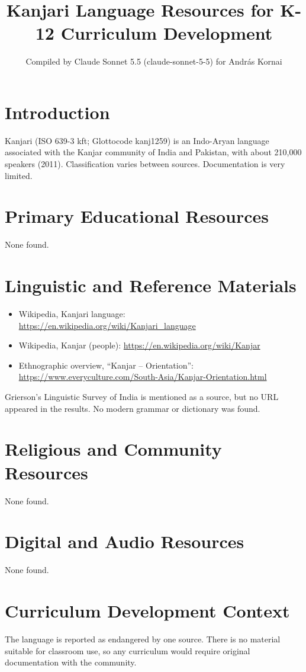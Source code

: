 \documentclass[12pt]{article}
\title{Kanjari Language Resources for K-12 Curriculum Development}
\author{Compiled by Claude Sonnet 5.5 (claude-sonnet-5-5) for Andr\'as Kornai}
\date{}
\begin{document}
\maketitle

\section{Introduction}
Kanjari (ISO 639-3 kft; Glottocode kanj1259) is an Indo-Aryan language associated with the Kanjar community of India and Pakistan, with about 210,000 speakers (2011). Classification varies between sources. Documentation is very limited.

\section{Primary Educational Resources}
None found.

\section{Linguistic and Reference Materials}
\begin{itemize}
\item Wikipedia, Kanjari language: \url{https://en.wikipedia.org/wiki/Kanjari_language}
\item Wikipedia, Kanjar (people): \url{https://en.wikipedia.org/wiki/Kanjar}
\item Ethnographic overview, ``Kanjar -- Orientation'': \url{https://www.everyculture.com/South-Asia/Kanjar-Orientation.html}
\end{itemize}
Grierson's Linguistic Survey of India is mentioned as a source, but no URL appeared in the results. No modern grammar or dictionary was found.

\section{Religious and Community Resources}
None found.

\section{Digital and Audio Resources}
None found.

\section{Curriculum Development Context}
The language is reported as endangered by one source. There is no material suitable for classroom use, so any curriculum would require original documentation with the community.
\end{document}
